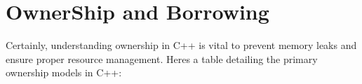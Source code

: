 \chapter{Owner\+Ship and Borrowing}
\hypertarget{md_docs_2own__docs_2cpp__fudamentals_2ownership__and__borrowing}{}\label{md_docs_2own__docs_2cpp__fudamentals_2ownership__and__borrowing}
\label{md_docs_2own__docs_2cpp__fudamentals_2ownership__and__borrowing_autotoc_md152}%
%

\begin{DoxyItemize}
\item Certainly, understanding ownership in C++ is vital to prevent memory leaks and ensure proper resource management. Here\textquotesingle{}s a table detailing the primary ownership models in C++\+:
\end{DoxyItemize}

